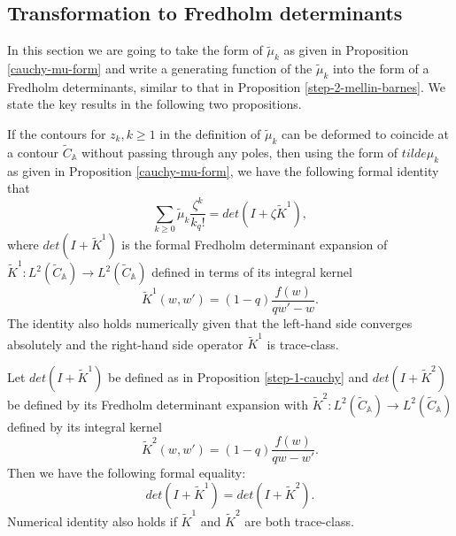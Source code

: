 \subsection{Transformation to Fredholm determinants}
In this section we are going to take the form of $\tilde{\mu}_k$ as given in Proposition \ref{cauchy-mu-form} and write a generating function of the $\tilde{\mu}_k$ into the form of a Fredholm determinants, similar to that in Proposition \ref{step-2-mellin-barnes}. We state the key results in the following two propositions.

\begin{proposition}
\label{step-1-cauchy}
If the contours for $z_k, k \ge 1$ in the definition of $\tilde{\mu}_k$ can be deformed to coincide at a contour $\tilde{C}_{\mathbb{A}}$ without passing through any poles, then using the form of $tilde{\mu}_k$ as given in Proposition \ref{cauchy-mu-form}, we have the following formal identity that 
$$\sum_{k \ge 0} \tilde{\mu}_k \frac{\zeta^k}{k_q!} = det(I+\zeta \tilde{K}^1),$$ where $det(I+\tilde{K}^1)$ is the formal Fredholm determinant expansion of $\tilde{K}^1: L^2(\tilde{C}_{\mathbb{A}}) \rightarrow L^2(\tilde{C}_{\mathbb{A}})$ defined in terms of its integral kernel $$\tilde{K}^1(w,w') = (1-q) \frac{f(w)}{qw' - w}.$$ The identity also holds numerically given that the left-hand side converges absolutely and the right-hand side operator $\tilde{K}^1$ is trace-class.
\end{proposition}

\begin{proposition}
\label{step-2-cauchy}
Let $det(I+\tilde{K}^1)$ be defined as in Proposition \ref{step-1-cauchy} and $det(I+\tilde{K}^2)$ be defined by its Fredholm determinant expansion with $\tilde{K}^2: L^2(\tilde{C}_{\mathbb{A}}) \rightarrow L^2(\tilde{C}_{\mathbb{A}})$ defined by its integral kernel $$\tilde{K}^2(w,w') = (1-q) \frac{f(w)}{qw - w'}.$$ Then we have the following formal equality: $$det(I+\tilde{K}^1) = det(I+\tilde{K}^2).$$ Numerical identity also holds if $\tilde{K}^1$ and $\tilde{K}^2$ are both trace-class.
\end{proposition}

